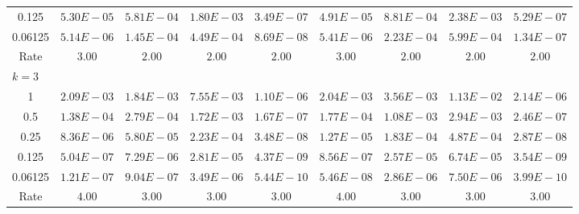 \documentclass[english,11pt,3p,number,sort&compress]{elsarticle}
\begin{document}
\begin{table}[H]
{\begin{tabular}{c c c c c | c c c c}
		0.125   & $5.30E-05$ & $5.81E-04$ & $1.80E-03$ & $3.49E-07$ & $4.91E-05$ & $8.81E-04$ & $2.38E-03$ & $5.29E-07$ \\
		0.06125 & $5.14E-06$ & $1.45E-04$ & $4.49E-04$ & $8.69E-08$ & $5.41E-06$ & $2.23E-04$ & $5.99E-04$ & $1.34E-07$ \\
		Rate & $3.00$ & $2.00$ & $2.00$ & $2.00$ & $3.00$ & $2.00$ & $2.00$ & $2.00$ \\
		\midrule
		\multicolumn{9}{l}{$k = 3$} \\
		1       & $2.09E-03$ & $1.84E-03$ & $7.55E-03$ & $1.10E-06$ & $2.04E-03$ & $3.56E-03$ & $1.13E-02$ & $2.14E-06$ \\
		0.5     & $1.38E-04$ & $2.79E-04$ & $1.72E-03$ & $1.67E-07$ & $1.77E-04$ & $1.08E-03$ & $2.94E-03$ & $2.46E-07$ \\
		0.25    & $8.36E-06$ & $5.80E-05$ & $2.23E-04$ & $3.48E-08$ & $1.27E-05$ & $1.83E-04$ & $4.87E-04$ & $2.87E-08$ \\
		0.125   & $5.04E-07$ & $7.29E-06$ & $2.81E-05$ & $4.37E-09$ & $8.56E-07$ & $2.57E-05$ & $6.74E-05$ & $3.54E-09$ \\
		0.06125 & $1.21E-07$ & $9.04E-07$ & $3.49E-06$ & $5.44E-10$ & $5.46E-08$ & $2.86E-06$ & $7.50E-06$ & $3.99E-10$ \\
		Rate & $4.00$ & $3.00$ & $3.00$ & $3.00$ & $4.00$ & $3.00$ & $3.00$ & $3.00$ \\
        \bottomrule
    \end{tabular}}
	\label{tab:bishop-convergence-04999}
\end{table}
\end{document}
